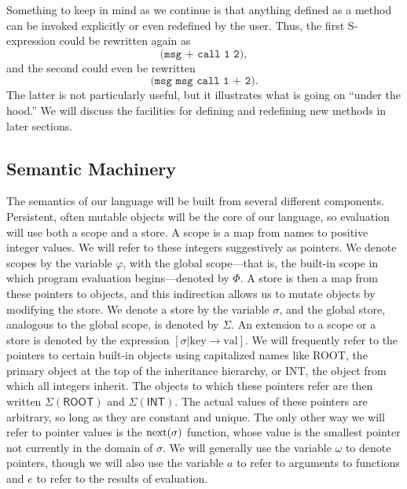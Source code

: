 \documentclass[twocolumn]{article}
\begin{document}
Something to keep in mind as we continue is that anything defined as a
method can be invoked explicitly or even redefined by the user. Thus,
the first S-expression could be rewritten again as
\[ \texttt{(msg + call 1 2)}, \]
and the second could even be rewritten
\[ \texttt{(msg msg call 1 + 2)}. \] The latter is not particularly
useful, but it illustrates what is going on ``under the hood.'' We
will discuss the facilities for defining and redefining new methods in
later sections.

\subsection*{Semantic Machinery}
The semantics of our language will be built from several different
components. Persistent, often mutable objects will be the core of our
language, so evaluation will use both a scope and a store. A scope is
a map from names to positive integer values. We will refer to these
integers suggestively as pointers. We denote scopes by the variable
$\varphi$, with the global scope---that is, the built-in scope in which
program evaluation begins---denoted by $\Phi$. A store is then a map
from these pointers to objects, and this indirection allows us to
mutate objects by modifying the store. We denote a store by the
variable $\sigma$, and the global store, analogous to the global
scope, is denoted by $\Sigma$. An extension to a scope or a store is
denoted by the expression
$[\sigma|\text{key}\rightarrow\text{val}]$. We will frequently refer to
the pointers to certain built-in objects using capitalized names like
\textsf{ROOT}, the primary object at the top of the inheritance
hierarchy, or \textsf{INT}, the object from which all integers
inherit. The objects to which these pointers refer are then written
$\Sigma(\mathsf{ROOT})$ and $\Sigma(\mathsf{INT})$. The actual values
of these pointers are arbitrary, so long as they are constant and
unique. The only other way we will refer to pointer values is the
$\operatorname{next}(\sigma)$ function, whose value is the smallest pointer not
currently in the domain of $\sigma$. We will generally use the
variable $\omega$ to denote pointers, though we will also use the
variable $a$ to refer to arguments to functions and $e$ to refer to
the results of evaluation.
\end{document}
